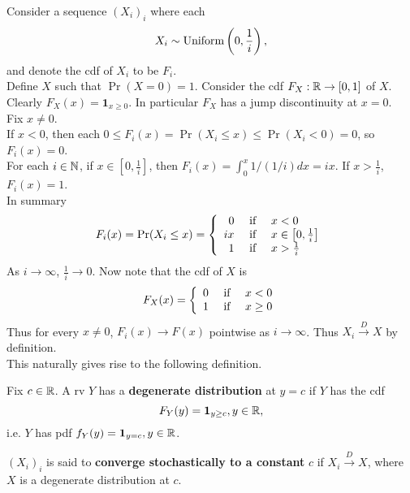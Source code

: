 \documentclass[11pt,fleqn]{book} %
\begin{document}
\begin{example} \label{eg:413}
Consider a sequence \((X_i)_i\) where each
\[
X_i \sim \operatorname{Uniform}\left(0, \frac{1}{i}\right),
\]
and denote the cdf of \(X_i\) to be \(F_i\).\\
\indent Define \(X\) such that \(\Pr(X = 0) = 1\). Consider the cdf \(F_X: \mathbb{R}\rightarrow[0, 1]\) of \(X\). Clearly \(F_X(x) = \mathbf{1}_{x \geq 0}\). In particular \(F_X\) has a jump discontinuity at \(x = 0\). \\
\indent Fix \(x \neq 0\). \\
\indent If \(x < 0\), then each \(0 \leq F_i(x) = \Pr(X_i \leq x) \leq \Pr(X_i < 0) = 0\), so \(F_i(x) = 0\). \\
\indent For each \(i \in \mathbb{N}\), if \(x \in \left[0, \frac1i\right]\), then \(F_i(x) = \int_0^x 1/(1/i)dx = ix\). If \(x > \frac1i\), \(F_i(x) = 1\). \\
\indent In summary
\[
F_i(x) = \Pr(X_i \leq x) = \left\{
\begin{array}{rcl}
0 & \text{ if } & x < 0 \\
ix & \text{ if } & x \in \left[0, \frac1i\right] \\
1 & \text{ if } & x > \frac1i
\end{array}
\right.
\]
\indent As \(i\rightarrow\infty\), \(\frac1i \rightarrow 0\). Now note that the cdf of \(X\) is
\[
F_X(x) = \left\{
\begin{array}{rcl}
0 & \text{ if } & x < 0 \\
1 & \text{ if } & x \geq 0
\end{array}
\right.
\]
\indent Thus for every \(x \neq 0\), \(F_i(x)\rightarrow F(x)\) pointwise as \(i \rightarrow \infty\). Thus \(X_i \xrightarrow{D} X\) by definition. \\
\indent This naturally gives rise to the following definition.
\end{example}

\begin{definition} \label{def:414}
Fix \(c \in \mathbb{R}\). A rv \(Y\) has a \textbf{degenerate distribution} at \(y = c\) if \(Y\) has the cdf
\[
F_Y(y) = \mathbf{1}_{y \geq c}, y \in \mathbb{R},
\]
i.e. \(Y\) has pdf \(f_Y(y) = \mathbf{1}_{y = c}, y \in \mathbb{R}\).
\end{definition}

\begin{definition} \label{def:415}
\((X_i)_i\) is said to \textbf{converge stochastically to a constant} \(c\) if \(X_i \xrightarrow{D} X\), where \(X\) is a degenerate distribution at \(c\).
\end{definition}
\end{document}
